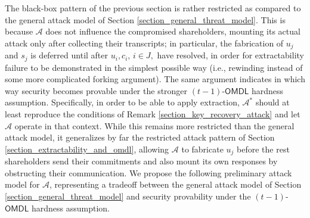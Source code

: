 \documentclass[10pt, psamsfonts, reqno]{amsart}
\theoremstyle{definition}
\theoremstyle{remark}
\numberwithin{equation}{section}
\begin{document}
The black-box pattern of the previous section
is rather restricted as compared to
the general attack model of
Section \ref{section_general_threat_model}.
This is because $\mathcal{A}$ does
not influence the compromised shareholders,
mounting its actual attack only after collecting their
transcripts; in particular,
the fabrication of $u_j$ and $s_j$
is deferred until after $u_i, c_i,\hspace{2pt} i \in J,$
have resolved,
in order for extractability failure
to be demonstrated in the simplest possible way
(i.e., rewinding instead of some more complicated forking argument).
The same argument
indicates in which way security becomes provable under
the stronger $(t-1)$-$\mathsf{OMDL}$ hardness assumption.
Specifically, in order to be able to apply extraction,
$\mathcal{A}^*$ should at least reproduce
the conditions of Remark \ref{section_key_recovery_attack}
and let $\mathcal{A}$ operate in that context.
While this remains more restricted than the general attack model,
it generalizes by far the restricted attack pattern of Section
\ref{section_extractability_and_omdl}, allowing
$\mathcal{A}$ to fabricate $u_j$ before the rest shareholders
send their commitments and also mount its own responses
by obstructing their communication.
We propose the following preliminary attack model for $\mathcal{A}$,
representing a tradeoff between
the general attack model of Section \ref{section_general_threat_model}
and security provability
under the $(t-1)$-$\mathsf{OMDL}$ hardness assumption.
\end{document}
